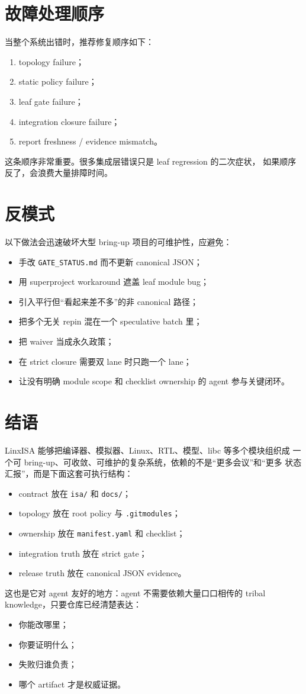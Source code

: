 \documentclass[UTF8,11pt,a4paper]{ctexart}
\begin{document}
\section{故障处理顺序}

当整个系统出错时，推荐修复顺序如下：

\begin{enumerate}
  \item topology failure；
  \item static policy failure；
  \item leaf gate failure；
  \item integration closure failure；
  \item report freshness / evidence mismatch。
\end{enumerate}

这条顺序非常重要。很多集成层错误只是 leaf regression 的二次症状，
如果顺序反了，会浪费大量排障时间。

\section{反模式}

以下做法会迅速破坏大型 bring-up 项目的可维护性，应避免：

\begin{itemize}
  \item 手改 \texttt{GATE\_STATUS.md} 而不更新 canonical JSON；
  \item 用 superproject workaround 遮盖 leaf module bug；
  \item 引入平行但“看起来差不多”的非 canonical 路径；
  \item 把多个无关 repin 混在一个 speculative batch 里；
  \item 把 waiver 当成永久政策；
  \item 在 strict closure 需要双 lane 时只跑一个 lane；
  \item 让没有明确 module scope 和 checklist ownership 的 agent 参与关键闭环。
\end{itemize}

\section{结语}

LinxISA 能够把编译器、模拟器、Linux、RTL、模型、libc 等多个模块组织成
一个可 bring-up、可收敛、可维护的复杂系统，依赖的不是“更多会议”和“更多
状态汇报”，而是下面这套可执行结构：

\begin{itemize}
  \item contract 放在 \texttt{isa/} 和 \texttt{docs/}；
  \item topology 放在 root policy 与 \texttt{.gitmodules}；
  \item ownership 放在 \texttt{manifest.yaml} 和 checklist；
  \item integration truth 放在 strict gate；
  \item release truth 放在 canonical JSON evidence。
\end{itemize}

这也是它对 agent 友好的地方：agent 不需要依赖大量口口相传的 tribal
knowledge，只要仓库已经清楚表达：

\begin{itemize}
  \item 你能改哪里；
  \item 你要证明什么；
  \item 失败归谁负责；
  \item 哪个 artifact 才是权威证据。
\end{itemize}
\end{document}
